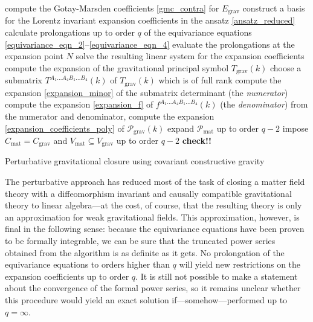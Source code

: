 \begin{algorithm}[H]\label{perturbative_algorithm}
  \DontPrintSemicolon
  compute the Gotay-Marsden coefficients \eqref{gmc_contra} for $E_\text{grav}$ \;
  construct a basis for the Lorentz invariant expansion coefficients in the ansatz \eqref{ansatz_reduced}\;
  calculate prolongations up to order $q$ of the equivariance equations \eqref{equivariance_eqn_2}--\eqref{equivariance_eqn_4} \;
  evaluate the prolongations at the expansion point $N$ \;
  solve the resulting linear system for the expansion coefficients \;
  compute the expansion of the gravitational principal symbol $T_\text{grav}(k)$ \;
  choose a submatrix $T^{A_1\dots A_4B_1\dots B_4}(k)$ of $T_\text{grav}(k)$ which is of full rank \;
  compute the expansion \eqref{expansion_minor} of the submatrix determinant (the \emph{numerator}) \;
  compute the expansion \eqref{expansion_f} of $f^{A_1\dots A_4B_1\dots B_4}(k)$ (the \emph{denominator}) \;
  from the numerator and denominator, compute the expansion \eqref{expansion_coefficients_poly} of $\mathcal P_\text{grav}(k)$ \;
  expand $\mathcal P_\text{mat}$ up to order $q-2$ \;
  impose $C_\text{mat} = C_\text{grav}$ and $V_\text{mat} \subseteq V_\text{grav}$ up to order $q-2$ \textbf{check!!} \;
  \caption{Perturbative gravitational closure using covariant constructive gravity}
\end{algorithm}

The perturbative approach has reduced most of the task of closing a matter field theory with a diffeomorphism invariant and causally compatible gravitational theory to linear algebra---at the cost, of course, that the resulting theory is only an approximation for weak gravitational fields. This approximation, however, is final in the following sense: because the equivariance equations have been proven to be formally integrable, we can be sure that the truncated power series obtained from the algorithm is as definite as it gets. \cite{Seiler_2010} No prolongation of the equivariance equations to orders higher than $q$ will yield new restrictions on the expansion coefficients up to order $q$. It is still not possible to make a statement about the convergence of the formal power series, so it remains unclear whether this procedure would yield an exact solution if---somehow---performed up to $q=\infty$.

